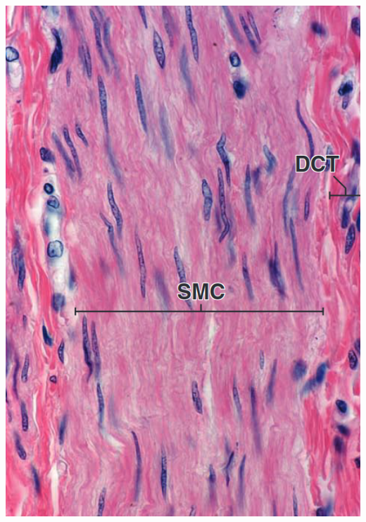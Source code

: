 \begin{itemize}
\begin{center}
    \includegraphics[scale=0.25]{images/week-1-rp12.png}


\end{center}
\end{itemize}
